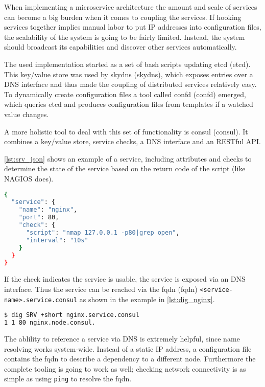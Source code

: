 When implementing a microservice architecture the amount and scale of services can become a big burden when it comes to coupling the services.
If hooking services together implies manual labor to put IP addresses into configuration files, the scalability of the system is going to be fairly limited.
Instead, the system should broadcast its capabilities and discover other services automatically.

The used implementation started as a set of bash scripts updating \gls{etcd} (\glsdesc{etcd}).
This key/value store was used by \gls{skydns} (\glsdesc{skydns}), which exposes entries
over a DNS interface and thus made the coupling of distributed services relatively easy. To dynamically create configuration files a tool called
\gls{confd} (\glsdesc{confd}) emerged, which queries \gls{etcd} and produces configuration files from templates if a watched value changes.

A more holistic tool to deal with this set of functionality is \gls{consul} (\glsdesc{consul}). It combines a key/value store, service checks,
a DNS interface and an RESTful API.

\autoref{lst:srv_json} shows an example of a service, including attributes and checks to determine the state of the service based on the return code of the script (like NAGIOS does). 

\begin{lstlisting}[language=bash,
    caption={Example of service definition within \gls{consul}. If the keyword \texttt{open} is not found within the nmap output the service is set into a warning state.},
    label={lst:srv_json}]
{
  "service": {
    "name": "nginx",
    "port": 80,
    "check": {
      "script": "nmap 127.0.0.1 -p80|grep open",
      "interval": "10s"
    }
  }
}
\end{lstlisting}

If the check indicates the service is usable, the service is exposed via an DNS interface.
Thus the service can be reached via the \gls{fqdn} (\glsdesc{fqdn}) \lstinline{<service-name>.service.consul}
as shown in the example in \autoref{lst:dig_nginx}.
\begin{lstlisting}[language=bash,
    caption={DNS query of \lstinline{nginx} service, issued with \texttt{dig}, a common DNS resolver.},
    label={lst:dig_nginx}]
$ dig SRV +short nginx.service.consul
1 1 80 nginx.node.consul.
\end{lstlisting}

The ablility to reference a service via DNS is extremely helpful, since name resolving works system-wide. Instead of a static IP address,
a configuration file contains the \gls{fqdn} to describe a dependency to a different node. Furthermore the complete tooling
is going to work as well; checking network connectivity is as simple as using \lstinline{ping} to resolve the \gls{fqdn}.

